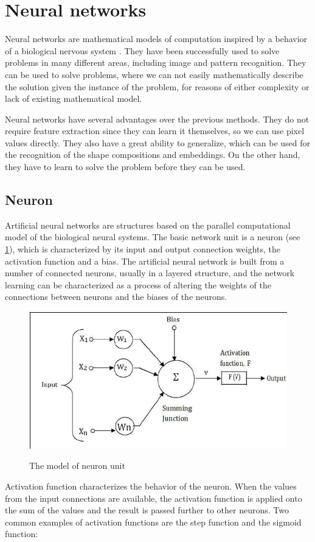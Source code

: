 \section{Neural networks}
Neural networks are mathematical models of computation inspired by a behavior of a biological nervous system \cite{bishop}. They have been successfully used to solve problems in many different areas, including image and pattern recognition. They can be used to solve problems, where we can not easily mathematically describe the solution given the instance of the problem, for reasons of either complexity or lack of existing mathematical model.

Neural networks have several advantages over the previous methods. They do not require feature extraction since they can learn it themselves, so we can use pixel values directly. They also have a great ability to generalize, which can be used for the recognition of the shape compositions and embeddings. On the other hand, they have to learn to solve the problem before they can be used. 

\subsection{Neuron}
Artificial neural networks are structures based on the parallel computational model of the biological neural systems. The basic network unit is a neuron (see \cref{fig:neuron}), which is characterized by its input and output connection weights, the activation function and a bias. The artificial neural network is built from a number of connected neurons, usually in a layered structure, and the network learning can be characterized as a process of altering the weights of the connections between neurons and the biases of the neurons. 

\begin{figure}
\centering
\includegraphics[width=.5\linewidth]{ext/neuron.png}
\label{fig:neuron}
\caption{The model of neuron unit}
\end{figure}

Activation function characterizes the behavior of the neuron. When the values from the input connections are available, the activation function is applied onto the sum of the values and the result is passed further to other neurons. Two common examples of activation functions are the step function and the sigmoid function:

